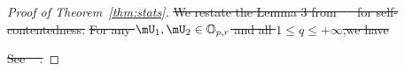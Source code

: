 \documentclass[lettersize,onecolumn,journal]{IEEEtran}
\theoremstyle{definition}
\newtheorem{lem}{Lemma}
\theoremstyle{definition}
\newtheorem{conjecture}{Conjecture}
\newcommand{\of}[1]{\left(#1\right)}
\providecommand{\DIFdeltex}[1]{{\protect\color{red}\sout{#1}}}                      %
\providecommand{\DIFdel}[1]{\texorpdfstring{\DIFdeltex{#1}}{}} %
\begin{document}
\begin{proof}[Proof of Theorem~\ref{thm:stats}]


\DIFdel{We restate the Lemma 3 from \mbox{%
\cite{zhang2018tensor} }\hspace{0pt}%
for self-contentedness. 
}%
\DIFdel{For any $\mU_1, \mU_2 \in \mathbb{O}_{p,r}$ and all $1 \leq q \leq +\infty$,we have
    }%

\DIFdel{See \mbox{%
\citet[Proof of Lemma 3]{zhang2018tensor}}\hspace{0pt}%
.
}%


\end{proof}
\end{document}
